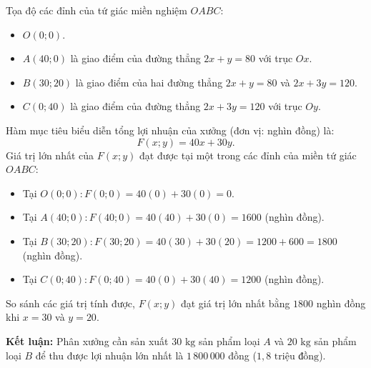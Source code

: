 \documentclass[12pt,a4paper]{article}
\begin{document}
Tọa độ các đỉnh của tứ giác miền nghiệm $OABC$:
\begin{itemize}[leftmargin=0.5cm, itemsep=1pt, topsep=1pt]
    \item $O(0; 0)$.
    \item $A(40; 0)$ là giao điểm của đường thẳng $2x + y = 80$ với trục $Ox$.
    \item $B(30; 20)$ là giao điểm của hai đường thẳng $2x + y = 80$ và $2x + 3y = 120$.
    \item $C(0; 40)$ là giao điểm của đường thẳng $2x + 3y = 120$ với trục $Oy$.
\end{itemize}

Hàm mục tiêu biểu diễn tổng lợi nhuận của xưởng (đơn vị: nghìn đồng) là:
\[
F(x; y) = 40x + 30y.
\]
Giá trị lớn nhất của $F(x; y)$ đạt được tại một trong các đỉnh của miền tứ giác $OABC$:
\begin{itemize}[leftmargin=0.5cm, itemsep=1pt, topsep=1pt]
    \item Tại $O(0; 0)\colon F(0; 0) = 40(0) + 30(0) = 0$.
    \item Tại $A(40; 0)\colon F(40; 0) = 40(40) + 30(0) = 1600$ (nghìn đồng).
    \item Tại $B(30; 20)\colon F(30; 20) = 40(30) + 30(20) = 1200 + 600 = 1800$ (nghìn đồng).
    \item Tại $C(0; 40)\colon F(0; 40) = 40(0) + 30(40) = 1200$ (nghìn đồng).
\end{itemize}
So sánh các giá trị tính được, $F(x; y)$ đạt giá trị lớn nhất bằng $1800$ nghìn đồng khi $x = 30$ và $y = 20$.

\textbf{Kết luận:} Phân xưởng cần sản xuất $30\text{ kg}$ sản phẩm loại $A$ và $20\text{ kg}$ sản phẩm loại $B$ để thu được lợi nhuận lớn nhất là $1\,800\,000$ đồng ($1{,}8\text{ triệu đồng}$).
\end{document}
